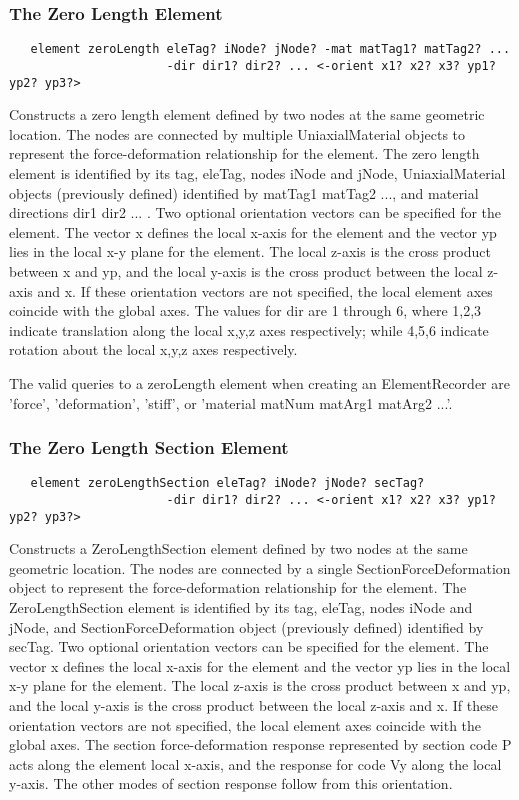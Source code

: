 \documentclass[12pt]{article}
\begin{document}
\subsubsection{The Zero Length Element}
{\sf\small
\begin{verbatim}
   element zeroLength eleTag? iNode? jNode? -mat matTag1? matTag2? ...
                      -dir dir1? dir2? ... <-orient x1? x2? x3? yp1? yp2? yp3?>
\end{verbatim}
}

\noindent Constructs a zero length element defined by two nodes at the
same geometric location. The nodes are connected by multiple
UniaxialMaterial objects to represent the force-deformation
relationship for the element. The zero length element is identified
by its tag, eleTag, nodes iNode and jNode, UniaxialMaterial objects
(previously defined) identified by matTag1 matTag2 ..., and material
directions dir1 dir2 ... . Two optional orientation vectors can be
specified for the element. The vector x defines the local x-axis for
the element and the vector yp lies in the local x-y plane for the
element. The local z-axis is the cross product between x and yp, and
the local y-axis is the cross product between the local z-axis and x.
If these orientation vectors are not specified, the local element axes
coincide with the global axes. The values for dir are 1 through 6,
where 1,2,3 indicate translation along the local x,y,z axes
respectively; while 4,5,6 indicate rotation about the local x,y,z axes
respectively. 

The valid queries to a zeroLength element when creating an ElementRecorder
are 'force', 'deformation', 'stiff', or 'material matNum matArg1 matArg2 ...'.

\subsubsection{The Zero Length Section Element}
{\sf\small
\begin{verbatim}
   element zeroLengthSection eleTag? iNode? jNode? secTag?
                      -dir dir1? dir2? ... <-orient x1? x2? x3? yp1? yp2? yp3?>
\end{verbatim}
}

\noindent Constructs a ZeroLengthSection element defined by two nodes at the
same geometric location. The nodes are connected by a single
SectionForceDeformation object to represent the force-deformation
relationship for the element. The ZeroLengthSection element is identified
by its tag, eleTag, nodes iNode and jNode, and SectionForceDeformation object
(previously defined) identified by secTag. Two optional orientation vectors can be
specified for the element. The vector x defines the local x-axis for
the element and the vector yp lies in the local x-y plane for the
element. The local z-axis is the cross product between x and yp, and
the local y-axis is the cross product between the local z-axis and x.
If these orientation vectors are not specified, the local element axes
coincide with the global axes. The section force-deformation response
represented by section code P acts along the element local x-axis, and
the response for code Vy along the local y-axis. The other modes of
section response follow from this orientation.
\end{document}
